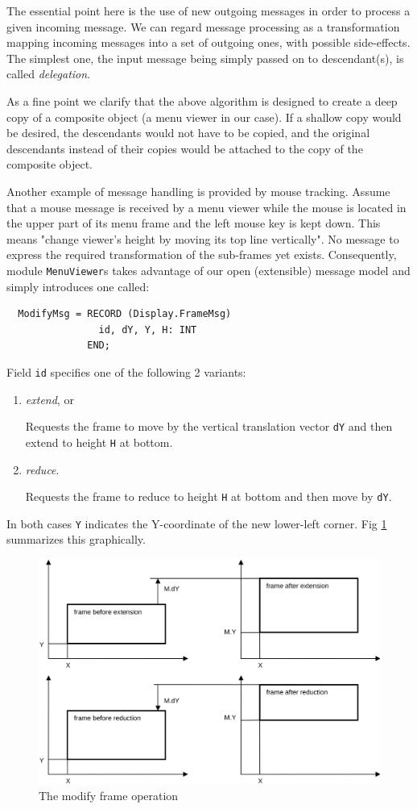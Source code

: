 The essential point here is the use of new outgoing messages
in order to process a given incoming message.
We can regard message processing as a transformation
mapping incoming messages into a set of outgoing ones, with possible side-effects.
The simplest one, the input message being simply passed on to descendant(s),
is called \emph{delegation}.

As a fine point we clarify that the above algorithm is designed to create a deep copy
of a composite object (a menu viewer in our case).  If a shallow copy would be desired,
the descendants would not have to be copied, and the original descendants
instead of their copies would be attached to the copy of the composite object.

Another example of message handling is provided by mouse tracking.  Assume that
a mouse message is received by a menu viewer while the mouse is located in the upper part
of its menu frame and the left mouse key is kept down.  This means "change viewer's height
by moving its top line vertically".  No message to express the required transformation
of the sub-frames yet exists.  Consequently, module \verb|MenuViewer|s takes advantage of
our open (extensible) message model and simply introduces one called:
\begin{verbatim}
  ModifyMsg = RECORD (Display.FrameMsg)
                id, dY, Y, H: INT
              END;
\end{verbatim}
Field \verb|id| specifies one of the following 2 variants:
\begin{enumerate}
  \item \emph{extend}, or

    Requests the frame to move by the vertical translation vector \verb|dY|
    and then extend to height \verb|H| at bottom.

  \item \emph{reduce}.

    Requests the frame to reduce to height \verb|H| at bottom
    and then move by \verb|dY|.
\end{enumerate}
In both cases \verb|Y| indicates the Y-coordinate of the new lower-left corner.
Fig \ref{fig:modify} summarizes this graphically.
\begin{figure}[h!]
  \centering
  \includegraphics[width=.9\textwidth]{i/a}
  \caption{The modify frame operation}
  \label{fig:modify}
\end{figure}

